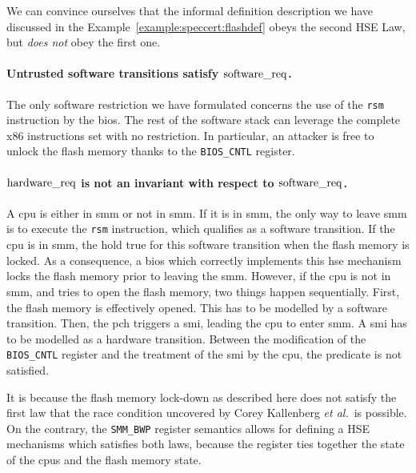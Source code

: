 \begin{example}
  We can convince ourselves that the informal definition description we have
  discussed in the Example~\ref{example:speccert:flashdef} obeys the second HSE
  Law, but \emph{does not} obey the first one.
  \paragraph{Untrusted software transitions satisfy $\mathrm{software\_req}$.}
  The only software restriction we have formulated concerns the use of the
  \texttt{rsm} instruction by the \ac{bios}.
  The rest of the software stack can leverage the complete x86 instructions set
  with no restriction.
  In particular, an attacker is free to unlock the flash memory thanks to the
  \texttt{BIOS\_CNTL} register.

  \paragraph{$\mathrm{hardware\_req}$ is not an invariant with respect to
    $\mathrm{software\_req}$.}
  A \ac{cpu} is either in \ac{smm} or not in \ac{smm}.
  If it is in \ac{smm}, the only way to leave \ac{smm} is to execute the
  \texttt{rsm} instruction, which qualifies as a software transition.
  If the \ac{cpu} is in \ac{smm}, the  hold true for this
  software transition when the flash memory is locked.
  As a consequence, a \ac{bios} which correctly implements this \ac{hse}
  mechanism locks the flash memory prior to leaving the \ac{smm}.
  However, if the \ac{cpu} is not in \ac{smm}, and tries to open the flash
  memory, two things happen sequentially.
  First, the flash memory is effectively opened.
  This has to be modelled by a software transition.
  Then, the \ac{pch} triggers a \ac{smi}, leading the \ac{cpu} to enter
  \ac{smm}.
  A \ac{smi} has to be modelled as a hardware transition.
  Between the modification of the \texttt{BIOS\_CNTL} register and the treatment
  of the \ac{smi} by the \ac{cpu}, the  predicate is not
  satisfied.

  It is because the flash memory lock-down as described here does not satisfy
  the first law that the race condition uncovered by Corey Kallenberg \emph{et
    al.}\,\cite{kallenberg2015racecondition} is possible.
  On the contrary, the \texttt{SMM\_BWP} register semantics allows for defining
  a HSE mechanisms which satisfies both laws, because the register ties together
  the state of the \acp{cpu} and the flash memory state.
\end{example}


